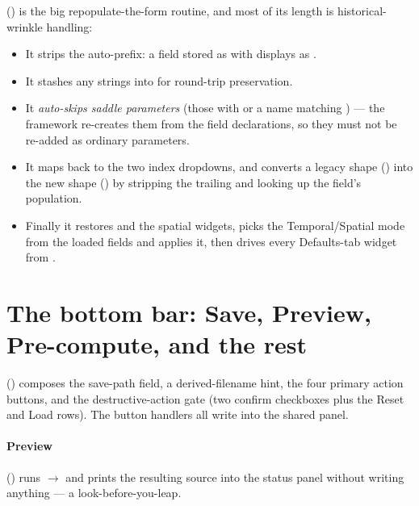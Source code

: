  () is the big
repopulate-the-form routine, and most of its length is historical-wrinkle handling:

\begin{itemize}
  \item It strips the auto-prefix: a field stored as  with
         displays as .
  \item It stashes any  strings into  for
        round-trip preservation.
  \item It \emph{auto-skips saddle parameters} (those with 
        or a name matching ) --- the framework re-creates them
        from the field declarations, so they must not be re-added as ordinary
        parameters.
  \item It maps  back to the two index dropdowns, and converts a
        legacy  shape () into the new
         shape () by stripping the
        trailing  and looking up the field's population.
  \item Finally it restores  and the spatial widgets,
        picks the Temporal/Spatial mode from the loaded fields and applies it, then
        drives every Defaults-tab widget from .
\end{itemize}

\section{The bottom bar: Save, Preview, Pre-compute, and the rest}

 () composes the
save-path field, a derived-filename hint, the four primary action buttons, and the
destructive-action gate (two confirm checkboxes plus the Reset and Load rows). The
button handlers all write into the shared  panel.

\paragraph{Preview}  () runs
 $\to$  and prints the resulting
 source into the status panel without writing anything --- a
look-before-you-leap.

